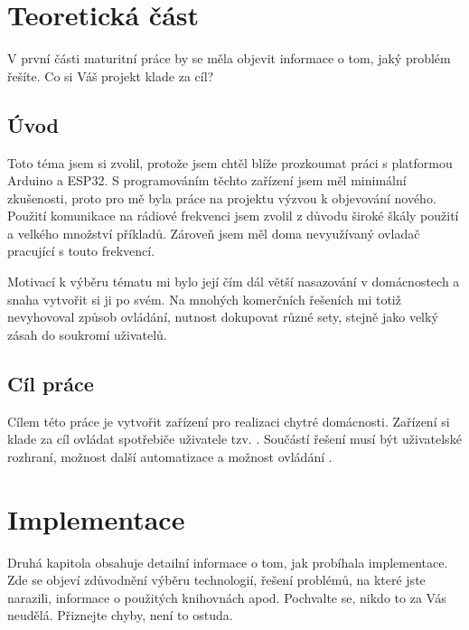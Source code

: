 \documentclass[11pt,a4paper,twoside,openright]{report}
\begin{document}
	
	
	
	\setcounter{tocdepth}{2}
	\tableofcontents
	
	\chapter{Teoretická část}
	\pagestyle{fancy}
	
	V první části maturitní práce by se měla objevit informace o tom, jaký problém řešíte. Co si Váš projekt klade za cíl?
	
	\section{Úvod}
	
	Toto téma jsem si zvolil, protože jsem chtěl blíže prozkoumat práci s platformou Arduino a ESP32. S programováním těchto zařízení jsem měl minimální zkušenosti, proto pro mě byla práce na projektu výzvou k objevování nového. Použití komunikace na rádiové frekvenci jsem zvolil z důvodu široké škály použití a velkého množství příkladů. Zároveň jsem měl doma nevyužívaný ovladač pracující s touto frekvencí.
	
	
	
	Motivací k výběru tématu  mi bylo její čím dál větší nasazování v domácnostech a snaha vytvořit si ji po svém. Na mnohých komerčních řešeních mi totiž nevyhovoval způsob ovládání, nutnost dokupovat různé sety, stejně jako velký zásah do soukromí uživatelů.
	
	
	\section{Cíl práce}
	
	Cílem této práce je vytvořit zařízení pro realizaci chytré domácnosti. Zařízení si klade za cíl ovládat spotřebiče uživatele tzv. . Součástí řešení musí být uživatelské rozhraní, možnost další automatizace a možnost ovládání .
	
	
	\chapter{Implementace}
	
	Druhá kapitola obsahuje detailní informace o tom, jak probíhala implementace. Zde se objeví zdůvodnění výběru technologií, řešení problémů, na které jste narazili, informace o použitých knihovnách apod. Pochvalte se, nikdo to za Vás neudělá. Přiznejte chyby, není to ostuda.
	
\end{document}
